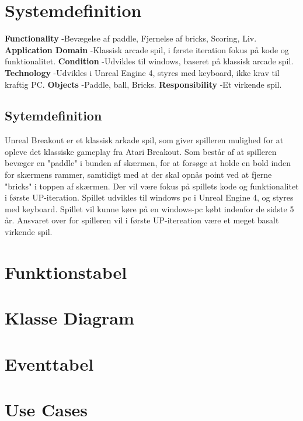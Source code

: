 
\section{Systemdefinition}
\textbf{Functionality}
\newline
-Bevægelse af paddle, Fjernelse af bricks, Scoring, Liv.
\newline
\textbf{Application Domain}
\newline
-Klassisk arcade spil, i første iteration fokus på kode
og funktionalitet.
\newline
\textbf{Condition}\newline
-Udvikles til windows, baseret på klassisk arcade spil.
\newline
\textbf{Technology}\newline
-Udvikles i Unreal Engine 4, styres med keyboard, ikke krav
til kraftig PC.
\newline
\textbf{Objects}\newline
-Paddle, ball, Bricks.
\newline
\textbf{Responsibility}\newline
-Et virkende spil.

\subsection{Sytemdefinition}
Unreal Breakout er et klassisk arkade spil, som giver spilleren mulighed for at opleve det klassiske gameplay fra Atari 
Breakout. Som består af at spilleren bevæger en "paddle" i bunden af skærmen, for at forsøge at holde en bold
inden for skærmens rammer, samtidigt med at der skal opnås point ved at fjerne "bricks" i toppen af skærmen.
Der vil være fokus på spillets kode og funktionalitet i første UP-iteration. Spillet udvikles til windows pc
i Unreal Engine 4, og styres med keyboard. Spillet vil kunne køre på en windows-pc købt indenfor de sidste 5 år.
Ansvaret over for spilleren vil i første UP-itereation være et meget basalt virkende spil.
\section{Funktionstabel}

\section{Klasse Diagram}

\section{Eventtabel}

\section{Use Cases}
